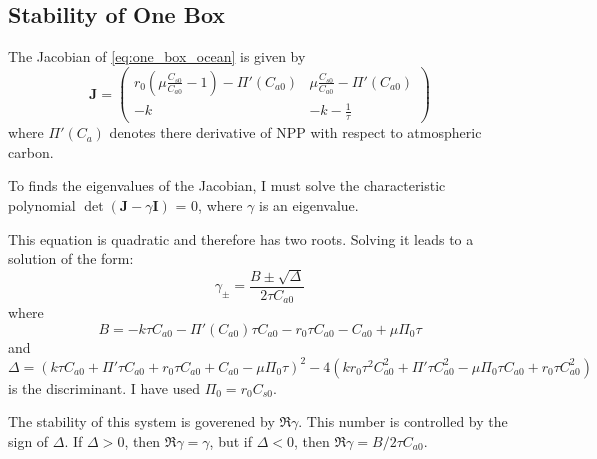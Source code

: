 \subsection{Stability of One Box}
The Jacobian of \cref{eq:one_box_ocean} is given by
\begin{equation}
  \label{eq:jacobian_of_one_box}
    \bm{J} = 
    \begin{pmatrix}
    r_0 \left( \mu \frac{C_{s0}}{C_{a0}} - 1\right) - \Pi'(C_{a0}) & 
    \mu \frac{C_{s0}}{C_{a0}} - \Pi'(C_{a0}) \\
    -k & -k - \frac{1}{\tau}
    \end{pmatrix}
  \end{equation}
where $\Pi'(C_a)$ denotes there derivative of NPP with respect to atmospheric carbon.
  
To finds the eigenvalues of the Jacobian, I must solve the characteristic polynomial $\det(\bm{J} - \gamma \bm{I})$ = 0, where $\gamma$ is an eigenvalue.

This equation is quadratic and therefore has two roots. Solving it leads to a solution of the form:
\begin{equation}
  \label{eq:eigenvalues_of_one_box_jac}
  \gamma_{\pm} = \frac{B \pm \sqrt{\Delta}}{2\tau C_{a0}}
\end{equation}
where
\begin{equation}
  \label{eq:B_in_one_box}
  B = -k \tau  C_{a0}-\Pi'(C_{a0}) \tau  C_{a0}-r_0 \tau  C_{a0}-C_{a0}+\mu  \Pi_0 \tau
\end{equation}
and
\begin{equation}
  \label{eq:discriminant_from_one_box}
  \Delta = \left(k \tau  C_{a0} +\Pi'\tau  C_{a0}+r_0 \tau  C_{a0}+C_{a0}-\mu  \Pi_0 \tau \right)^2-4 \left(k r_0 \tau ^2 C_{a0}^2+\Pi' \tau  C_{a0}^2-\mu  \Pi_0 \tau  C_{a0} +r_0 \tau  C_{a0}^2\right)
\end{equation}
is the discriminant. I have used $\Pi_0 = r_0 C_{s0}$.

The stability of this system is goverened by $\Re \gamma$. This number is controlled by the sign of $\Delta$. If $\Delta > 0$, then $\Re \gamma = \gamma$, but if $\Delta < 0$, then
$\Re \gamma = B / 2\tau C_{a0}$. 

